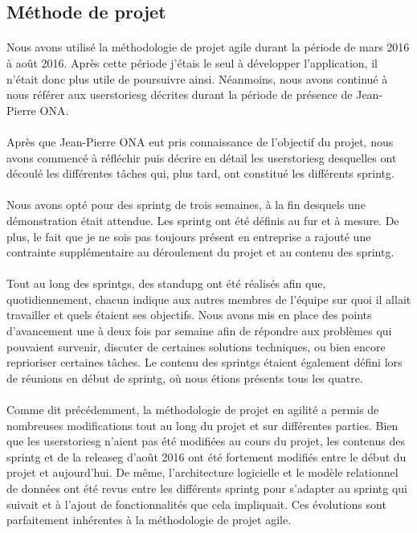 \documentclass[12pt,a4paper]{report}
\begin{document}
\subsection{Méthode de projet}
\paragraph*{}Nous avons utilisé la méthodologie de projet agile durant la période de mars 2016 à août 2016. Après cette période j'étais le seul à développer l'application, il n'était donc plus utile de poursuivre ainsi. Néanmoins, nous avons continué à nous référer aux \gls{userstoriesg} décrites durant la période de présence de Jean-Pierre ONA. 
\paragraph*{}Après que Jean-Pierre ONA eut pris connaissance de l’objectif du projet, nous avons commencé à réfléchir puis décrire en détail les \gls{userstoriesg} desquelles ont découlé les différentes tâches qui, plus tard, ont constitué les différents \gls{sprintg}.
\paragraph*{}Nous avons opté pour des \gls{sprintg} de trois semaines, à la fin desquels une démonstration était attendue. Les \gls{sprintg} ont été définis au fur et à mesure. De plus, le fait que je ne sois pas toujours présent en entreprise a rajouté une contrainte supplémentaire au déroulement du projet et au contenu des \gls{sprintg}.
\paragraph*{}Tout au long des \gls{sprintg}s, des \gls{standupg} ont été réalisés afin que, quotidiennement, chacun indique aux autres membres de l’équipe sur quoi il allait travailler et quels étaient ses objectifs. Nous avons mis en place des points d’avancement une à deux fois par semaine afin de répondre aux problèmes qui pouvaient survenir, discuter de certaines solutions techniques, ou bien encore reprioriser certaines tâches. Le contenu des \gls{sprintg}s étaient également défini lors de réunions en début de \gls{sprintg}, où nous étions présents tous les quatre.
\paragraph*{}Comme dit précédemment, la méthodologie de projet en agilité a permis de nombreuses modifications tout au long du projet et sur différentes parties. Bien que les \gls{userstoriesg} n’aient pas été modifiées au cours du projet, les contenus des \gls{sprintg} et de la \gls{releaseg} d’août 2016 ont été fortement modifiés entre le début du projet et aujourd’hui. De même, l’architecture logicielle et le modèle relationnel de données ont été revus entre les différents \gls{sprintg} pour s’adapter au \gls{sprintg} qui suivait et à l’ajout de fonctionnalités que cela impliquait. Ces évolutions sont parfaitement inhérentes à la méthodologie de projet agile.
\end{document}
